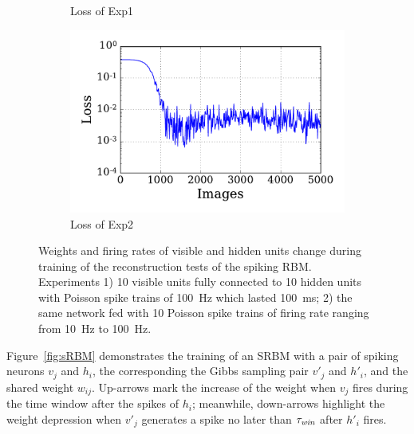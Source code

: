 \begin{figure}
\begin{subfigure}[t]{0.48\textwidth}
		\caption{Loss of Exp1}
	\end{subfigure}
	\begin{subfigure}[t]{0.48\textwidth}
		\includegraphics[width=\textwidth]{pics_sdlm/10_exp_SRBM_Orig/exp2_mse_nons.pdf}
		\caption{Loss of Exp2}
	\end{subfigure}
	\caption[SRBM training of the reconstruction tests.]{Weights and firing rates of visible and hidden units change during training of the reconstruction tests of the spiking RBM. 
		Experiments 1) 10 visible units fully connected to 10 hidden units with Poisson spike trains of 100~Hz which lasted 100~ms; 2) the same network fed with 10 Poisson spike trains of firing rate ranging from 10~Hz to 100~Hz.}
	\label{fig:srbm_orig}
\end{figure}

Figure~\ref{fig:sRBM} demonstrates the training of an SRBM with a pair of spiking neurons $v_j$ and $h_i$, the corresponding the Gibbs sampling pair $v'_j$ and $h'_i$, and the shared weight $w_{ij}$.
Up-arrows mark the increase of the weight when $v_j$ fires during the time window after the spikes of $h_i$;
meanwhile, down-arrows highlight	 the weight depression when $v'_j$ generates a spike no later than $\tau_{\textit{\textrm{win}}}$ after $h'_i$ fires.







